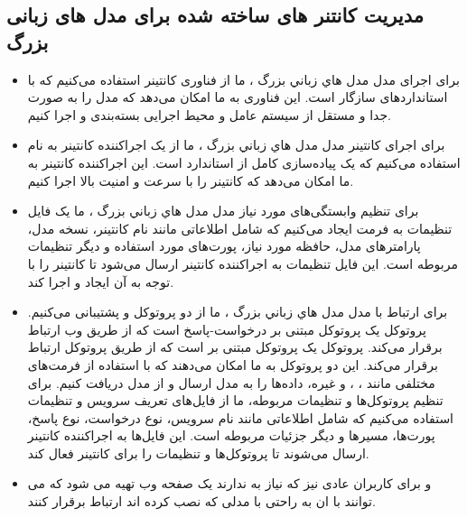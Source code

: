 \subsection{مدیریت کانتنر های ساخته شده برای مدل های زبانی بزرگ}
\begin{itemize}[label=-]
  \item
  برای اجرای مدل مدل ﻫﺎﻱ ﺯﺑﺎﻧﻲ ﺑﺰﺭگ ، ما از فناوری کانتینر استفاده می‌کنیم که با استانداردهای  \cite{girma2018evaluation} سازگار است. این فناوری به ما امکان می‌دهد که مدل را به صورت جدا و مستقل از سیستم عامل و محیط اجرایی بسته‌بندی و اجرا کنیم.
  \item
  برای اجرای کانتینر مدل مدل ﻫﺎﻱ ﺯﺑﺎﻧﻲ ﺑﺰﺭگ ، ما از یک اجراکننده کانتینر به نام  \cite{containers/youki_2024} استفاده می‌کنیم که یک پیاده‌سازی کامل از استاندارد  است. این اجراکننده کانتینر به ما امکان می‌دهد که کانتینر را با سرعت و امنیت بالا اجرا کنیم.
  \item
  برای تنظیم وابستگی‌های مورد نیاز مدل مدل ﻫﺎﻱ ﺯﺑﺎﻧﻲ ﺑﺰﺭگ ، ما یک فایل تنظیمات به فرمت  ایجاد می‌کنیم که شامل اطلاعاتی مانند نام کانتینر، نسخه مدل، پارامترهای مدل، حافظه مورد نیاز، پورت‌های مورد استفاده و دیگر تنظیمات مربوطه است. این فایل تنظیمات به اجراکننده کانتینر ارسال می‌شود تا کانتینر را با توجه به آن ایجاد و اجرا کند.
  \item
  برای ارتباط با مدل مدل ﻫﺎﻱ ﺯﺑﺎﻧﻲ ﺑﺰﺭگ ، ما از دو پروتوکل و   پشتیبانی می‌کنیم. پروتوکل   یک پروتوکل مبتنی بر درخواست-پاسخ است که از طریق وب ارتباط برقرار می‌کند. پروتوکل  یک پروتوکل مبتنی بر  است که از طریق پروتوکل  ارتباط برقرار می‌کند. این دو پروتوکل به ما امکان می‌دهند که با استفاده از فرمت‌های مختلفی مانند ، ،  \cite{popic2016performance} و غیره، داده‌ها را به مدل ارسال و از مدل دریافت کنیم. برای تنظیم پروتوکل‌ها و تنظیمات مربوطه، ما از فایل‌های تعریف سرویس و تنظیمات استفاده می‌کنیم که شامل اطلاعاتی مانند نام سرویس، نوع درخواست، نوع پاسخ، پورت‌ها، مسیرها و دیگر جزئیات مربوطه است. این فایل‌ها به اجراکننده کانتینر ارسال می‌شوند تا پروتوکل‌ها و تنظیمات را برای کانتینر فعال کند.
  \item و برای کاربران عادی نیز که نیاز به  \cite{bloch2006design} ندارند یک صفحه وب تهیه می شود که می توانند با ان به راحتی با مدلی که نصب کرده اند ارتباط برقرار کنند.
\end{itemize}

